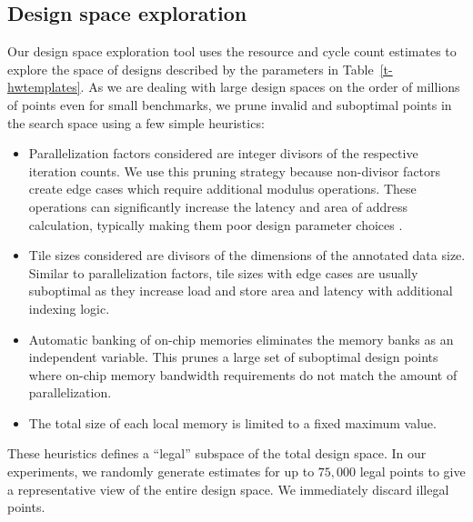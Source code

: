 \subsection{Design space exploration}
Our design space exploration tool uses the resource and cycle count estimates
to explore the space of designs described by the parameters in Table~\ref{t-hwtemplates}.
As we are dealing with large design spaces on the order of millions of points even for small benchmarks,
we prune invalid and suboptimal points in the search space using a few simple heuristics:
\begin{itemize}
  \item Parallelization factors considered are integer divisors of the respective iteration counts. We use this pruning strategy because non-divisor factors create edge cases which require additional modulus operations. These operations can significantly increase the latency and area of address calculation, typically making them poor design parameter choices \cite{raghus-paper}.
  \item Tile sizes considered are divisors of the dimensions of the annotated data size. Similar to parallelization factors, tile sizes with edge cases are usually suboptimal as they increase load and store area and latency with additional indexing logic.
  \item Automatic banking of on-chip memories eliminates the memory banks as an independent variable. This prunes a large set of suboptimal design points where on-chip memory bandwidth requirements do not match the amount of parallelization.
  \item The total size of each local memory is limited to a fixed maximum value.
\end{itemize}

These heuristics defines a ``legal'' subspace of the total design space. In our experiments, we randomly generate estimates for up to $75,000$ legal points to give a representative view of the entire design space. We immediately discard illegal points.

